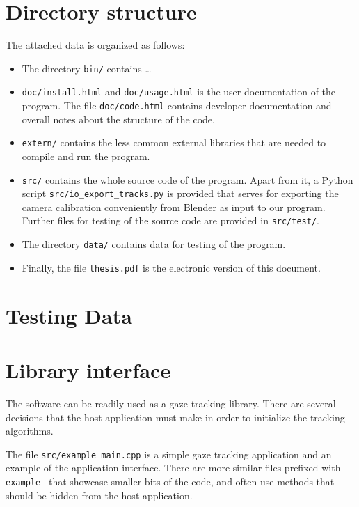 
\setcounter{section}{0}
\renewcommand{\thesection}{\Alph{section}}

\section{Directory structure}
\label{s:dirstructure}

The attached data is organized as follows:

\begin{itemize}
\item The directory {\tt bin/} contains \dots

\item {\tt doc/install.html} and {\tt doc/usage.html} is the user documentation of the program.
The file {\tt doc/code.html} contains developer documentation and overall notes about the structure of the code.

\item {\tt extern/} contains the less common external libraries that are needed to compile and run the program.

\item {\tt src/} contains the whole source code of the program.
Apart from it, a Python script {\tt src/io\_export\_tracks.py} is provided that serves for exporting the camera calibration conveniently from Blender as input to our program.
Further files for testing of the source code are provided in {\tt src/test/}.

\item The directory {\tt data/} contains data for testing of the program.

\item Finally, the file {\tt thesis.pdf} is the electronic version of this document.

\end{itemize}

\section{Testing Data}

\todo{\dots}

\section{Library interface}

The software can be readily used as a gaze tracking library.
There are several decisions that the host application must make in order to initialize the tracking algorithms.
\todo{\dots}

The file {\tt src/example\_main.cpp} is a simple gaze tracking application and an example of the application interface.
There are more similar files prefixed with {\tt example\_} that showcase smaller bits of the code, and often use methods that should be hidden from the host application.
